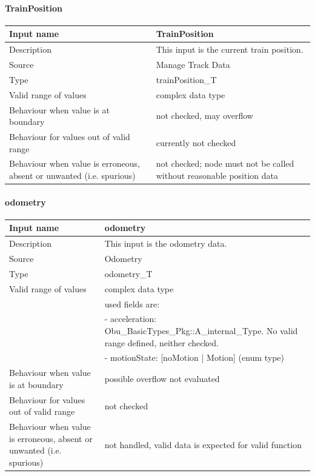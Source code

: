 \paragraph{TrainPosition}

\begin{longtable}{p{}p{}}
\toprule
Input name				& TrainPosition \\
\midrule
Description				& This input is the current train position. \\
\midrule
Source					& Manage Track Data \\ 
\midrule
Type					& trainPosition\_T \\
\midrule
Valid range of values	& complex data type \\
\midrule
Behaviour when value is at boundary	& not checked, may overflow \\
\midrule
Behaviour for values out of valid range	& currently not checked \\
\midrule
Behaviour when value is erroneous, absent or unwanted (i.e. spurious) & not checked; node must not be called without reasonable position data \\
\bottomrule
\end{longtable}


\paragraph{odometry}

\begin{longtable}{p{}p{}}
\toprule
Input name				& odometry \\
\midrule
Description				& This input is the odometry data. \\
\midrule
Source					& Odometry \\ 
\midrule
Type					& odometry\_T \\
\midrule
Valid range of values	& complex data type \\
 & used fields are: \\
 & - acceleration: Obu\_BasicTypes\_Pkg::A\_internal\_Type. No valid range defined, neither checked. \\
 & - motionState: [noMotion | Motion] (enum type) \\
\midrule
Behaviour when value is at boundary	& possible overflow not evaluated \\
\midrule
Behaviour for values out of valid range	& not checked \\
\midrule
Behaviour when value is erroneous, absent or unwanted (i.e. spurious) & not handled, valid data is expected for valid function \\
\bottomrule
\end{longtable}


